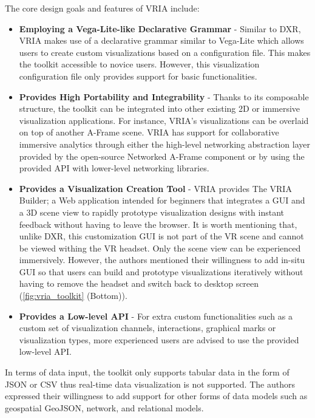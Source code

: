 \documentclass{vgtc}                          %
\begin{document}
\noindent The core design goals and features of VRIA include:
\begin{itemize}
    \item \textbf{Employing a Vega-Lite-like Declarative Grammar} - Similar to DXR, VRIA makes use of a
    declarative grammar similar to Vega-Lite \cite{vega_lite} which allows users to create custom
    visualizations based on a configuration file. This makes the toolkit accessible to novice users.
    However, this visualization configuration file only provides support for basic functionalities.
    \item \textbf{Provides High Portability and Integrability} - Thanks to its composable structure, the
    toolkit can be integrated into other existing 2D or immersive visualization applications. For instance,
    VRIA's visualizations can be overlaid on top of another A-Frame scene. VRIA has support for collaborative
    immersive analytics through either the high-level networking abstraction layer provided by the
    open-source Networked A-Frame component or by using the provided API with lower-level networking
    libraries. 
    \item \textbf{Provides a Visualization Creation Tool} - VRIA provides The VRIA Builder; a Web application
    intended for beginners that integrates a GUI and a 3D scene view to rapidly prototype visualization
    designs with instant feedback without having to leave the browser. It is worth mentioning that, unlike
    DXR, this customization GUI is not part of the VR scene and cannot be viewed withing the VR headset.
    Only the scene view can be experienced immersively. However, the authors mentioned their willingness
    to add in-situ GUI so that users can build and prototype visualizations iteratively without having
    to remove the headset and switch back to desktop screen (\autoref{fig:vria_toolkit} (Bottom)).
    \item \textbf{Provides a Low-level API} - For extra custom functionalities such as a custom set of
    visualization channels, interactions, graphical marks or visualization types, more experienced users
    are advised to use the provided low-level API.
\end{itemize}

\medskip

\noindent In terms of data input, the toolkit only supports tabular data in the form of JSON or CSV thus
real-time data visualization is not supported. The authors expressed their willingness to add support for
other forms of data models such as geospatial GeoJSON, network, and relational models.
\end{document}
